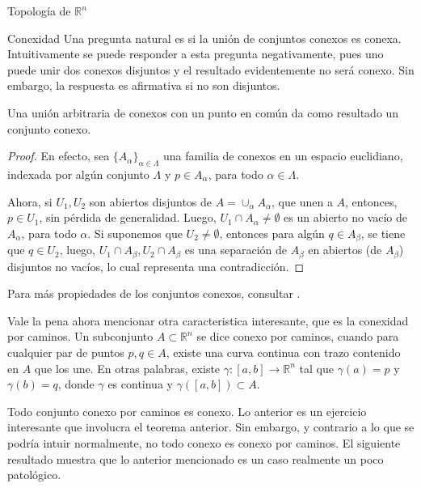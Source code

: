 \begin{chapter}{Topología de $\mathbb{R}^n$}
\begin{section}{Conexidad}
Una pregunta natural es si la unión de conjuntos conexos es conexa. Intuitivamente se puede responder a esta pregunta negativamente, pues uno puede unir dos conexos disjuntos y el resultado evidentemente no será conexo. Sin embargo, la respuesta es afirmativa si no son disjuntos.

\begin{them}

Una unión arbitraria de conexos con un punto en común da como resultado un conjunto conexo.

\end{them}

\begin{proof}

En efecto, sea $\{ A_{\alpha} \}_{\alpha \in \Lambda}$ una familia de conexos en un espacio euclidiano, indexada por algún conjunto $\Lambda$ y $p \in A_{\alpha}$, para todo $\alpha \in \Lambda$.

Ahora, si $U_1, U_2$ son abiertos disjuntos de $A = \cup_{\alpha} A_{\alpha}$, que unen a $A$, entonces, $p \in U_1$, sin pérdida de generalidad. Luego, $U_1 \cap A_{\alpha} \neq \emptyset$ es un abierto no vacío de $A_{\alpha}$, para todo $\alpha$. Si suponemos que $U_2 \neq \emptyset$, entonces para algún $q \in A_{\beta}$, se tiene que $q \in U_2$, luego, $U_1 \cap A_{\beta}, U_2 \cap A_{\beta}$ es una separación de $A_{\beta}$ en abiertos (de $A_{\beta}$) disjuntos no vacíos, lo cual representa una contradicción.

\end{proof}

Para más propiedades de los conjuntos conexos, consultar \cite{lima2004curso}.

Vale la pena ahora mencionar otra caracteristica interesante, que es la conexidad por caminos. Un subconjunto $A \subset \mathbb{R}^n$ se dice conexo por caminos, cuando para cualquier par de puntos $p, q \in A$, existe una curva continua con trazo contenido en $A$ que los une. En otras palabras, existe $\gamma: [a,b] \to \mathbb{R}^n$ tal que $\gamma(a) = p$ y $\gamma(b) = q$, donde $\gamma$ es continua y $\gamma([a,b])\subset A$.

Todo conjunto conexo por caminos es conexo. Lo anterior es un ejercicio interesante que involucra el teorema anterior. Sin embargo, y contrario a lo que se podría intuir normalmente, no todo conexo es conexo por caminos. El siguiente resultado muestra que lo anterior mencionado es un caso realmente un poco patológico.  

\begin{them}


\end{them}
\end{section}
\end{chapter}
